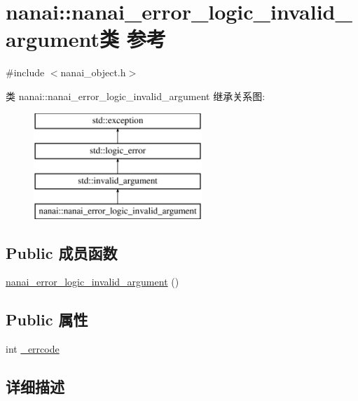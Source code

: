\hypertarget{classnanai_1_1nanai__error__logic__invalid__argument}{}\section{nanai\+:\+:nanai\+\_\+error\+\_\+logic\+\_\+invalid\+\_\+argument类 参考}
\label{classnanai_1_1nanai__error__logic__invalid__argument}


{\ttfamily \#include $<$nanai\+\_\+object.\+h$>$}

类 nanai\+:\+:nanai\+\_\+error\+\_\+logic\+\_\+invalid\+\_\+argument 继承关系图\+:\begin{figure}[H]
\begin{center}
\leavevmode
\includegraphics[height=4.000000cm]{classnanai_1_1nanai__error__logic__invalid__argument}
\end{center}
\end{figure}
\subsection*{Public 成员函数}
\begin{DoxyCompactItemize}
\item 
\hyperlink{classnanai_1_1nanai__error__logic__invalid__argument_a4a7a923d0bdaff2a9a450bdfe946adf2}{nanai\+\_\+error\+\_\+logic\+\_\+invalid\+\_\+argument} ()
\end{DoxyCompactItemize}
\subsection*{Public 属性}
\begin{DoxyCompactItemize}
\item 
int \hyperlink{classnanai_1_1nanai__error__logic__invalid__argument_a7a983c95e803de2afbc6220ca65496f4}{\+\_\+errcode}
\end{DoxyCompactItemize}


\subsection{详细描述}


